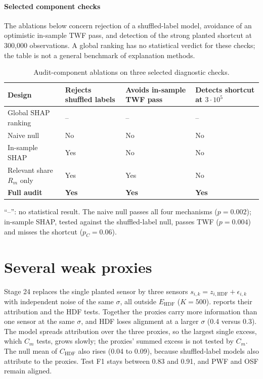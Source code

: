 \documentclass[10pt]{article}
\begin{document}
\paragraph{Selected component checks} The ablations below concern rejection of a shuffled-label model, avoidance of an optimistic in-sample TWF pass, and detection of the strong planted shortcut at 300,000 observations. A global ranking has no statistical verdict for these checks; the table is not a general benchmark of explanation methods.

\begin{table}[htbp]
\centering
\begin{threeparttable}
\caption{Audit-component ablations on three selected diagnostic checks.}
\label{tab:compare}
\footnotesize
\setlength{\tabcolsep}{3pt}
\begin{tabular}{@{}l>{\centering\arraybackslash}b{1.25cm}>{\centering\arraybackslash}b{1.25cm}>{\centering\arraybackslash}b{1.25cm}@{}}
\toprule
Design & Rejects shuffled labels & Avoids in-sample TWF pass & Detects shortcut at $3\cdot10^5$ \\
\midrule
Global SHAP ranking & -- & -- & -- \\
Naive null & No & No & No \\
In-sample SHAP & Yes & No & No \\
Relevant share $R_m$ only & Yes & Yes & No \\
\addlinespace
\textbf{Full audit} & \textbf{Yes} & \textbf{Yes} & \textbf{Yes} \\
\bottomrule
\end{tabular}
\begin{tablenotes}[flushleft]
\footnotesize
\item ``--'': no statistical result. The naive null passes all four
mechanisms ($p=0.002$); in-sample SHAP, tested against the shuffled-label
null, passes TWF ($p=0.004$) and misses the shortcut ($p_C=0.06$).
\end{tablenotes}
\end{threeparttable}
\end{table}

\section{Several weak proxies}

Stage 24 replaces the single planted sensor by three sensors $s_{i,k}=z_{i,\mathrm{HDF}}+\epsilon_{i,k}$ with independent noise of the same $\sigma$, all outside $E_{\mathrm{HDF}}$ ($K=500$).  reports their attribution and the HDF tests. Together the proxies carry more information than one sensor at the same $\sigma$, and HDF loses alignment at a larger $\sigma$ (0.4 versus 0.3). The model spreads attribution over the three proxies, so the largest single excess, which $C_m$ tests, grows slowly; the proxies' summed excess is not tested by $C_m$. The null mean of $C_{\mathrm{HDF}}$ also rises (0.04 to 0.09), because shuffled-label models also attribute to the proxies. Test F1 stays between 0.83 and 0.91, and PWF and OSF remain aligned.
\end{document}
